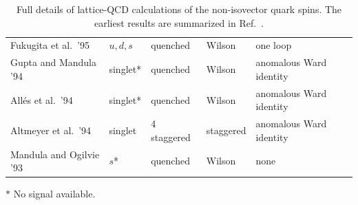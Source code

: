 \begin{table}[!t]
\begin{threeparttable}
\begin{tabular}{lllll}
  Fukugita et al.\ '95 \cite{Fukugita:1994fh} &
  $u,d,s$ & quenched & Wilson & one loop \\

  Gupta and Mandula '94 \cite{Gupta:1994qw} &
  singlet* & quenched & Wilson & anomalous Ward identity \\

  Allés et al.\ '94 \cite{Alles:1994ss} &
  singlet* & quenched & Wilson & anomalous Ward identity \\

  Altmeyer et al.\ '94 \cite{Altmeyer:1992nt} &
  singlet & 4 staggered & staggered & anomalous Ward identity \\

  Mandula and Ogilvie '93 \cite{Mandula:1992bc} &
  $s$* & quenched & Wilson & none \\
  \bottomrule
\end{tabular}
\begin{tablenotes}
\scriptsize
\item[$*$] No signal available.
\end{tablenotes}
\end{threeparttable}
\caption{\small Full details of lattice-QCD calculations of the non-isovector 
quark spins.
%
The earliest results are summarized in Ref.~\cite{Liu:1995kb}.}
\label{tablenonisovectorquarkspins}
\end{table}

